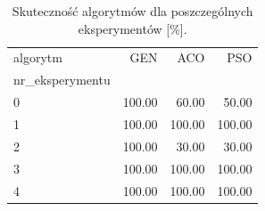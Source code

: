 \begin{table}
\caption{Skuteczność algorytmów dla poszczególnych eksperymentów [\%].}
\label{tab:success_rate}
\begin{tabular}{lrrr}
\toprule
algorytm & GEN & ACO & PSO \\
nr_eksperymentu &  &  &  \\
\midrule
0 & 100.00 & 60.00 & 50.00 \\
1 & 100.00 & 100.00 & 100.00 \\
2 & 100.00 & 30.00 & 30.00 \\
3 & 100.00 & 100.00 & 100.00 \\
4 & 100.00 & 100.00 & 100.00 \\
\bottomrule
\end{tabular}
\end{table}
